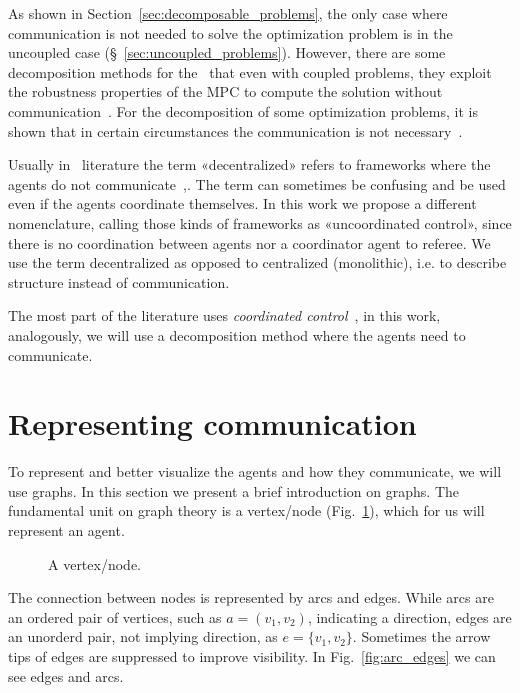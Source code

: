 \documentclass[../main.tex]{subfiles}
\begin{document}
As shown in Section~\ref{sec:decomposable_problems}, the only case where communication is not needed to solve the optimization problem is in the uncoupled case (\S~\ref{sec:uncoupled_problems}).
However, there are some decomposition methods for the \dmpc\ that even with coupled problems, they exploit the robustness properties of the MPC to compute the solution without communication~\cite{VahidNaghaviEtAl2014}.
For the decomposition of some optimization problems, it is shown that in certain circumstances the communication is not necessary~\cite{VoulgarisElia2022}.
\begin{remark}
  Usually in \dmpc\ literature the term «decentralized» refers to frameworks where the agents do not communicate~\cite[\S 4]{ChristofidesEtAl2013},\cite{NegenbornMaestre2014}.
  The term can sometimes be confusing and be used even if the agents coordinate themselves.
  In this work we propose a different nomenclature, calling those kinds of frameworks as «uncoordinated control», since there is no coordination between agents nor a coordinator agent to referee. We use the term decentralized as opposed to centralized (monolithic), i.e. to describe structure instead of communication.
\end{remark}

The most part of the literature uses \emph{coordinated control}~\cite{NegenbornMaestre2014, ArauzEtAl2021}, in this work, analogously, we will use a decomposition method where the agents need to communicate.

\section{Representing communication}

To represent and better visualize the agents and how they communicate, we will use graphs. In this section we present a brief introduction on graphs.
The fundamental unit on graph theory is a vertex/node (Fig.~\ref{fig:node}), which for us will represent an agent.
\begin{figure}[h]
  \centering
  \scalebox{1.25}
  {
  }
  \caption{A vertex/node.}\label{fig:node}
\end{figure}

The connection between nodes is represented by arcs and edges. While arcs are an ordered pair of vertices, such as ${a=(v_{1},v_{2})}$, indicating a direction, edges are an unorderd pair, not implying direction, as ${e=\{v_{1},v_{2}\}}$. Sometimes the arrow tips of edges are suppressed to improve visibility. In Fig.~\ref{fig:arc_edges} we can see edges and arcs.
\end{document}
